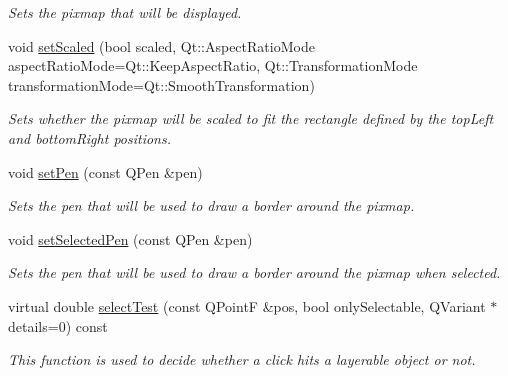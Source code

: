 \begin{DoxyCompactItemize}
\begin{DoxyCompactList}\small\item\em Sets the pixmap that will be displayed. \end{DoxyCompactList}\item 
\hypertarget{classQCPItemPixmap_ab4d44529a1c6c8d37d0ea7560e042777}{}void \hyperlink{classQCPItemPixmap_ab4d44529a1c6c8d37d0ea7560e042777}{set\+Scaled} (bool scaled, Qt\+::\+Aspect\+Ratio\+Mode aspect\+Ratio\+Mode=Qt\+::\+Keep\+Aspect\+Ratio, Qt\+::\+Transformation\+Mode transformation\+Mode=Qt\+::\+Smooth\+Transformation)\label{classQCPItemPixmap_ab4d44529a1c6c8d37d0ea7560e042777}

\begin{DoxyCompactList}\small\item\em Sets whether the pixmap will be scaled to fit the rectangle defined by the {\itshape top\+Left} and {\itshape bottom\+Right} positions. \end{DoxyCompactList}\item 
void \hyperlink{classQCPItemPixmap_acdade1305edb4b5cae14f97fd132065f}{set\+Pen} (const Q\+Pen \&pen)
\begin{DoxyCompactList}\small\item\em Sets the pen that will be used to draw a border around the pixmap. \end{DoxyCompactList}\item 
void \hyperlink{classQCPItemPixmap_afc5e479e88e53740176ce77cb70dd67a}{set\+Selected\+Pen} (const Q\+Pen \&pen)
\begin{DoxyCompactList}\small\item\em Sets the pen that will be used to draw a border around the pixmap when selected. \end{DoxyCompactList}\item 
virtual double \hyperlink{classQCPItemPixmap_a9f8436aa141fa0fb504191c882c2f4d9}{select\+Test} (const Q\+Point\+F \&pos, bool only\+Selectable, Q\+Variant $\ast$details=0) const 
\begin{DoxyCompactList}\small\item\em This function is used to decide whether a click hits a layerable object or not. \end{DoxyCompactList}\end{DoxyCompactItemize}
